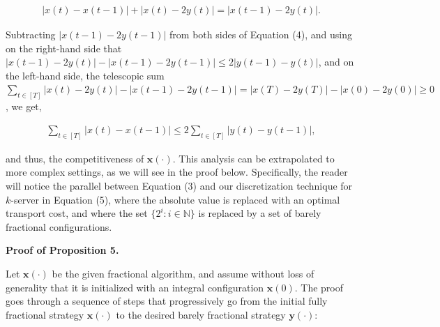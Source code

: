 \documentclass[10pt,a4paper]{article}
\begin{document}
\[\begin{gathered}
|x(t)-x(t-1)|+|x(t)-2y(t)|=|x(t-1)-2y(t)|.
\end{gathered}\]


Subtracting $|x(t-1)-2y(t-1)|$ from both sides of Equation (4), and using on the right-hand side that $|x(t-1)-2y(t)|-|x(t-1)-2y(t-1)|\leq 2|y(t-1)-y(t)|$, and on the left-hand side, the telescopic sum $\sum_{t\in[T]}|x(t)-2y(t)|-|x(t-1)-2y(t-1)|=|x(T)-2y(T)|-|x(0)-2y(0)|\geq 0$, we get,\par


\[\begin{gathered}
\sum_{t\in[T]}|x(t)-x(t-1)|\leq 2\sum_{t\in[T]}|y(t)-y(t-1)|,
\end{gathered}\]


and thus, the competitiveness of ${\boldsymbol{x}}(\cdot)$.
This analysis can be extrapolated to more complex settings, as we will see in the proof below. Specifically, the reader will notice the parallel between Equation (3) and our discretization technique for $k$-server in Equation (5), where the absolute value is replaced with an optimal transport cost, and where the set $\{2^{i}\colon i\in\mathbb{N}\}$ is replaced by a set of barely fractional configurations.\par





\par\medskip\noindent\textbf{Proof of Proposition 5.}\par




Let ${\boldsymbol{x}}(\cdot)$ be the given fractional algorithm, and assume without loss of generality that it is initialized with an integral configuration ${\boldsymbol{x}}(0)$. The proof goes through a sequence of steps that progressively go from the initial fully fractional strategy ${\boldsymbol{x}}(\cdot)$ to the desired barely fractional strategy ${\boldsymbol{y}}(\cdot)$:\par
\end{document}
